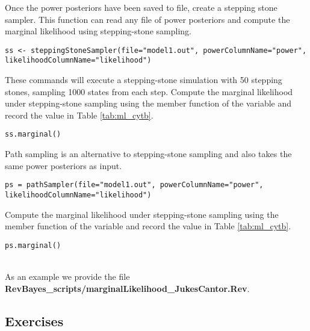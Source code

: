 Once the power posteriors have been saved to file, create a stepping stone sampler. 
This function can read any file of power posteriors and compute the marginal likelihood using stepping-stone sampling. 
{\tt \small \begin{snugshade*}
\begin{lstlisting}
ss <- steppingStoneSampler(file="model1.out", powerColumnName="power", likelihoodColumnName="likelihood")
\end{lstlisting}
\end{snugshade*}}

These commands will execute a stepping-stone simulation with 50 stepping stones, sampling 1000 states from each step. 
Compute the marginal likelihood under stepping-stone sampling using the member function  of the  variable and record the value in Table \ref{tab:ml_cytb}.
{\tt \begin{snugshade*}
\begin{lstlisting}
ss.marginal() 
\end{lstlisting}
\end{snugshade*}}

Path sampling is an alternative to stepping-stone sampling and also takes the same power posteriors as input. 
{\tt \small \begin{snugshade*}
\begin{lstlisting}
ps = pathSampler(file="model1.out", powerColumnName="power", likelihoodColumnName="likelihood")
\end{lstlisting}
\end{snugshade*}}

Compute the marginal likelihood under stepping-stone sampling using the member function  of the  variable and record the value in Table \ref{tab:ml_cytb}.
{\tt \begin{snugshade*}
\begin{lstlisting}
ps.marginal() 
\end{lstlisting}
\end{snugshade*}}

\noindent \\ \impmark As an example we provide the file \textbf{RevBayes\_scripts/marginalLikelihood\_JukesCantor.Rev}.


\subsection{Exercises}

